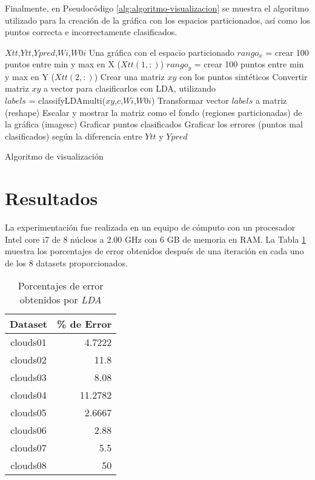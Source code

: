 \documentclass[journal]{IEEEtran}
\begin{document}
Finalmente, en Pseudocódigo \ref{alg:algoritmo-visualizacion} se muestra el algoritmo utilizado para la creación de la gráfica con los espacios particionados, así como los puntos correcta e incorrectamente clasificados.


\begin{algorithm} 
\footnotesize
\begin{algorithmic}[1] 
\REQUIRE  $Xtt$,$Ytt$,$Ypred$,$Wi$,$W0i$
\ENSURE Una gráfica con el espacio particionado
\STATE $rango_x$ = crear 100 puntos entre min y max en X ($Xtt(1,:)$)
\STATE $rango_y$ = crear 100 puntos entre min y max en Y ($Xtt(2,:)$)
\STATE Crear una matriz $xy$ con los puntos sintéticos
\STATE Convertir matriz $xy$ a vector para clasificarlos con LDA, utilizando\\
$labels$ = classifyLDAmulti($xy$,$c$,$Wi$,$W0i$)
\STATE Transformar vector $labels$ a matriz (reshape)
\STATE Escalar y mostrar la matriz como el fondo (regiones particionadas) de la gráfica (imagesc)
\STATE Graficar puntos clasificados
\STATE Graficar los errores (puntos mal clasificados) según la diferencia entre $Ytt$ y $Ypred$
\end{algorithmic} 
\caption{Algoritmo de visualización} 
\label{alg:algoritmo-visualizacion}
\end{algorithm}


\section{Resultados} 
\label{sec:resultados}
La experimentación fue realizada en un equipo de cómputo con un procesador Intel core i7 de 8 núcleos a 2.00 GHz con 6 GB de memoria en RAM.
La Tabla \ref{tab:porcentajes-error} muestra los porcentajes de error obtenidos después de una iteración en cada uno de los 8 datasets proporcionados.

\begin{table}[h]
\centering
\caption{Porcentajes de error obtenidos por \emph{LDA}}
\label{tab:porcentajes-error}
\begin{tabular}{@{}cr@{}}
\toprule
\textbf{Dataset} & \multicolumn{1}{c}{\textbf{\% de Error}} \\ \midrule
clouds01         & 4.7222                                \\
clouds02         & 11.8                                  \\
clouds03         & 8.08                                  \\
clouds04         & 11.2782                               \\
clouds05         & 2.6667                                \\
clouds06         & 2.88                                  \\
clouds07         & 5.5                                   \\
clouds08         & 50                                    \\ \bottomrule
\end{tabular}

\end{table}
\end{document}
